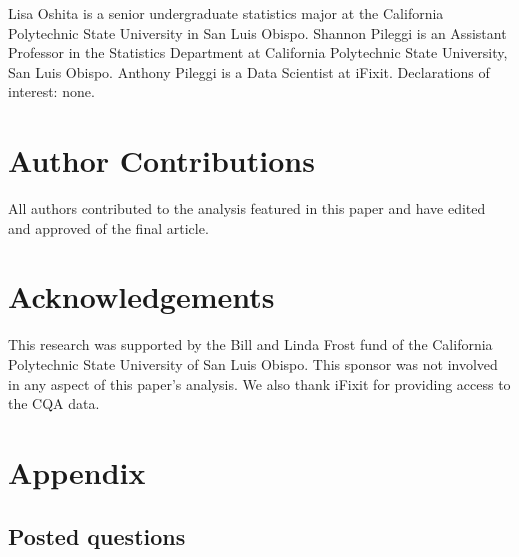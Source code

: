 \documentclass[]{interact}\usepackage[]{graphicx}\usepackage[]{color}
\begin{document}
{Lisa Oshita is a senior undergraduate statistics major at the California Polytechnic State University in San Luis Obispo. Shannon Pileggi is an Assistant Professor in the Statistics Department at California Polytechnic State University, San Luis Obispo. Anthony Pileggi is a Data Scientist at iFixit. Declarations of interest: none. 

\section{Author Contributions}

All authors contributed to the analysis featured in this paper and have edited and approved of the final article. 

\section{Acknowledgements}

This research was supported by the Bill and Linda Frost fund of the California Polytechnic State University of San Luis Obispo. This sponsor was not involved in any aspect of this paper's analysis. We also thank iFixit for providing access to the CQA data.


\section{Appendix} 

\subsection{Posted questions}

}
\end{document}
